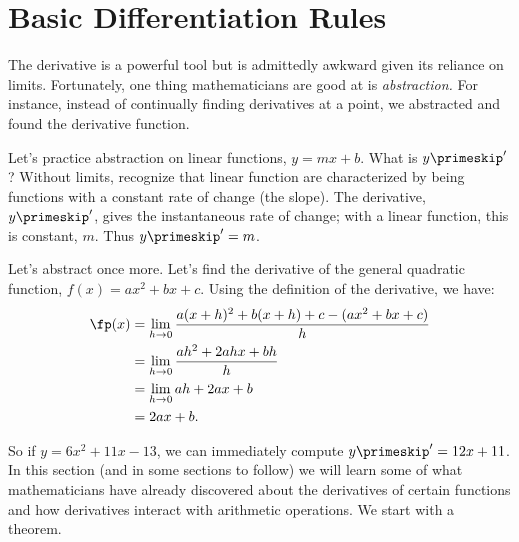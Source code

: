 \section{Basic Differentiation Rules}\label{sec:basic_diff_rules}

The derivative is a powerful tool but is admittedly awkward given its reliance on limits. Fortunately, one thing mathematicians are good at is \textit{abstraction.} For instance, instead of continually finding derivatives at a point, we abstracted and found the derivative function. 

Let's practice abstraction on linear functions, $y=mx+b$. What is $y\primeskip'$? Without limits, recognize that linear function are characterized by being functions with a constant rate of change (the slope). The derivative, $y\primeskip'$, gives the instantaneous rate of change; with a linear function, this is constant, $m$. Thus $y\primeskip'=m$. 

Let's abstract once more. Let's find the derivative of the general quadratic function, $f(x) = ax^2+bx+c$. Using the definition of the derivative, we have:
		\begin{align*}
		\fp(x) 	&=	\lim_{h\to 0}\frac{a(x+h)^2+b(x+h)+c-(ax^2+bx+c)}{h} \\
						&=	\lim_{h\to 0} \frac{ah^2+2ahx+bh}{h} \\
						&=	\lim_{h\to 0} ah+2ax+b\\
						&= 2ax+b.
		\end{align*}
		
So if $y = 6x^2+11x-13$, we can immediately compute $y\primeskip' = 12x+11$. \\

In this section (and in some sections to follow) we will learn some of what mathematicians have already discovered about the derivatives of certain functions and how derivatives interact with arithmetic operations. We start with a theorem.


